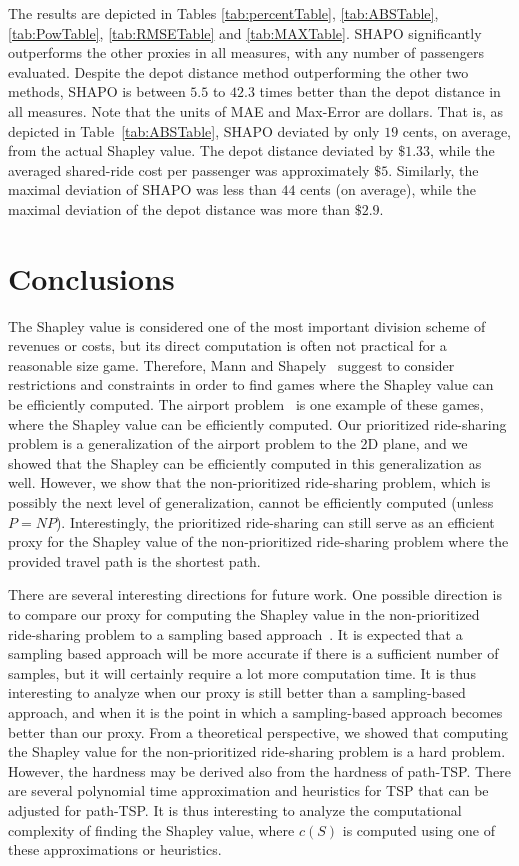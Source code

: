 \documentclass[sigconf]{aamas}
\begin{document}
The results are depicted in Tables \ref{tab:percentTable}, \ref{tab:ABSTable}, \ref{tab:PowTable}, \ref{tab:RMSETable} and \ref{tab:MAXTable}. 
SHAPO significantly outperforms the other proxies in all measures, with any number of passengers evaluated. Despite the depot distance method outperforming the other two methods, SHAPO is between $5.5$ to $42.3$ times better than the depot distance in all measures. Note that the units of MAE and Max-Error are dollars. That is, as depicted in Table~\ref{tab:ABSTable}, SHAPO deviated by only $19$ cents, on average, from the actual Shapley value. The depot distance deviated by $\$1.33$, while the averaged shared-ride cost per passenger was approximately $\$5$. Similarly, the maximal deviation of SHAPO was less than $44$ cents (on average), while the maximal deviation of the depot distance was more than $\$2.9$.


\section{Conclusions}
%
The Shapley value is considered one of the most important division scheme of revenues or costs, but its direct computation is often not practical for a reasonable size game. Therefore, Mann and Shapely~\cite{mann1962values} suggest to consider restrictions and constraints in order to find games where the Shapley value can be efficiently computed. The airport problem~\cite{littlechild1973simple} is one example of these games, where the Shapley value can be efficiently computed. Our prioritized ride-sharing problem is a generalization of the airport problem to the 2D plane, and we showed that the Shapley can be efficiently computed in this generalization as well. However, we show that the non-prioritized ride-sharing problem, which is possibly the next level of generalization, cannot be efficiently computed (unless $P=NP$). Interestingly, the prioritized  ride-sharing can still serve as an efficient proxy for the Shapley value of the non-prioritized ride-sharing problem where the provided travel path is the shortest path.

There are several interesting directions for future work. One possible  direction is to compare our proxy for computing the Shapley value in the non-prioritized ride-sharing problem to a sampling based approach~\cite{castro2009polynomial}. It is expected that a sampling based approach will be more accurate if there is a sufficient number of samples, but it will certainly require a lot more computation time. It is thus interesting to analyze when our proxy is still better than a sampling-based approach, and when it is the point in which a sampling-based approach becomes better than our proxy.
From a theoretical perspective, we showed that computing the Shapley value for the non-prioritized ride-sharing problem is a hard problem. However, the hardness may be derived also from the hardness of path-TSP. There are several polynomial time approximation and heuristics for TSP that can be adjusted for path-TSP. It is thus interesting to analyze the computational complexity of finding the Shapley value, where $c(S)$ is computed using one of these approximations or heuristics.
\end{document}
